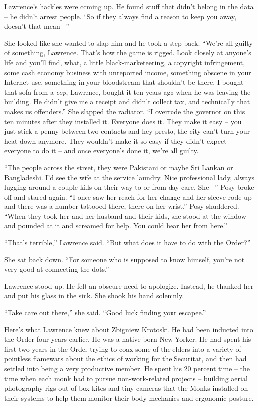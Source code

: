 Lawrence's hackles were coming up. He found stuff that didn't belong in 
the data -- he didn't arrest people. “So if they always find a reason 
to keep you away, doesn't that mean --”

She looked like she wanted to slap him and he took a step back. 
“We're all guilty of something, Lawrence. That's how the game is 
rigged. Look closely at anyone's life and you'll find, what, a little 
black-marketeering, a copyright infringement, some cash economy 
business with unreported income, something obscene in your Internet 
use, something in your bloodstream that shouldn't be there. I bought 
that sofa from a \emph{cop}, Lawrence, bought it ten years ago when he 
was leaving the building. He didn't give me a receipt and didn't 
collect tax, and technically that makes us offenders.” She slapped 
the radiator. “I overrode the governor on this ten minutes after they 
installed it. Everyone does it. They make it easy -- you just stick a 
penny between two contacts and hey presto, the city can't turn your 
heat down anymore. They wouldn't make it so easy if they didn't expect 
everyone to do it -- and once everyone's done it, we're all guilty.

“The people across the street, they were Pakistani or maybe Sri 
Lankan or Bangladeshi. I'd see the wife at the service laundry. Nice 
professional lady, always lugging around a couple kids on their way to 
or from day-care. She --” Posy broke off and stared again. “I once 
saw her reach for her change and her sleeve rode up and there was a 
number tattooed there, there on her wrist.” Posy shuddered. “When 
they took her and her husband and their kids, she stood at the window 
and pounded at it and screamed for help. You could hear her from 
here.”

“That's terrible,” Lawrence said. “But what does it have to do 
with the Order?”

She sat back down. “For someone who is supposed to know himself, 
you're not very good at connecting the dots.”

Lawrence stood up. He felt an obscure need to apologize. Instead, he 
thanked her and put his glass in the sink. She shook his hand solemnly.

“Take care out there,” she said. “Good luck finding your 
escapee.”

\tb

Here's what Lawrence knew about Zbigniew Krotoski. He had been inducted 
into the Order four years earlier. He was a native-born New Yorker. He 
had spent his first two years in the Order trying to coax some of the 
elders into a variety of pointless flamewars about the ethics of 
working for the Securitat, and then had settled into being a very 
productive member. He spent his 20 percent time -- the time when each 
monk had to pursue non-work-related projects -- building aerial 
photography rigs out of box-kites and tiny cameras that the Monks 
installed on their systems to help them monitor their body mechanics 
and ergonomic posture.

